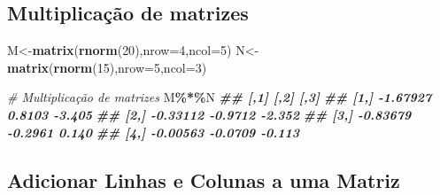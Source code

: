 \documentclass[
]{book}
\newenvironment{Shaded}{\begin{snugshade}}{\end{snugshade}}
\newcommand{\AttributeTok}[1]{\textcolor[rgb]{0.13,0.29,0.53}{#1}}
\newcommand{\CommentTok}[1]{\textcolor[rgb]{0.56,0.35,0.01}{\textit{#1}}}
\newcommand{\DecValTok}[1]{\textcolor[rgb]{0.00,0.00,0.81}{#1}}
\newcommand{\DocumentationTok}[1]{\textcolor[rgb]{0.56,0.35,0.01}{\textbf{\textit{#1}}}}
\newcommand{\FunctionTok}[1]{\textcolor[rgb]{0.13,0.29,0.53}{\textbf{#1}}}
\newcommand{\NormalTok}[1]{#1}
\newcommand{\OtherTok}[1]{\textcolor[rgb]{0.56,0.35,0.01}{#1}}
\newcommand{\SpecialCharTok}[1]{\textcolor[rgb]{0.81,0.36,0.00}{\textbf{#1}}}
\begin{document}
\subsection{Multiplicação de matrizes}\label{multiplicauxe7uxe3o-de-matrizes}

\begin{Shaded}
\begin{Highlighting}[]
\NormalTok{M}\OtherTok{\textless{}{-}}\FunctionTok{matrix}\NormalTok{(}\FunctionTok{rnorm}\NormalTok{(}\DecValTok{20}\NormalTok{),}\AttributeTok{nrow=}\DecValTok{4}\NormalTok{,}\AttributeTok{ncol=}\DecValTok{5}\NormalTok{)}
\NormalTok{N}\OtherTok{\textless{}{-}}\FunctionTok{matrix}\NormalTok{(}\FunctionTok{rnorm}\NormalTok{(}\DecValTok{15}\NormalTok{),}\AttributeTok{nrow=}\DecValTok{5}\NormalTok{,}\AttributeTok{ncol=}\DecValTok{3}\NormalTok{)}

\CommentTok{\# Multiplicação de matrizes}
\NormalTok{M}\SpecialCharTok{\%*\%}\NormalTok{N}
\DocumentationTok{\#\#          [,1]    [,2]   [,3]}
\DocumentationTok{\#\# [1,] {-}1.67927  0.8103 {-}3.405}
\DocumentationTok{\#\# [2,] {-}0.33112 {-}0.9712 {-}2.352}
\DocumentationTok{\#\# [3,] {-}0.83679 {-}0.2961  0.140}
\DocumentationTok{\#\# [4,] {-}0.00563 {-}0.0709 {-}0.113}
\end{Highlighting}
\end{Shaded}

\subsection{Adicionar Linhas e Colunas a uma Matriz}\label{adicionar-linhas-e-colunas-a-uma-matriz}
\end{document}

